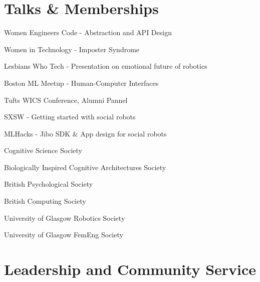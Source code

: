 \documentclass[]{csaund_resume-openfont}
\begin{document}
\pagebreak


\section{Talks \& Memberships}
\descript {}
\begin{tightemize}
\item Women Engineers Code - Abstraction and API Design
\item Women in Technology - Imposter Syndrome
\item Lesbians Who Tech - Presentation on emotional future of robotics 
\item Boston ML Meetup - Human-Computer Interfaces
\item Tufts WICS Conference, Alumni Pannel 
\end{tightemize}
\sectionsep

\descript {}
\begin{tightemize}
\item SXSW - Getting started with social robots
\item MLHacks - Jibo SDK \& App design for social robots
\end{tightemize}
\sectionsep

\descript{ }
\begin{tightemize}
\item Cognitive Science Society
\item Biologically Inspired Cognitive Architectures Society
\item British Psychological Society
\item British Computing Society
\item University of Glasgow Robotics Society
\item University of Glasgow FemEng Society
\end{tightemize}
\sectionsep


\section{Leadership and Community Service}
\end{document}
